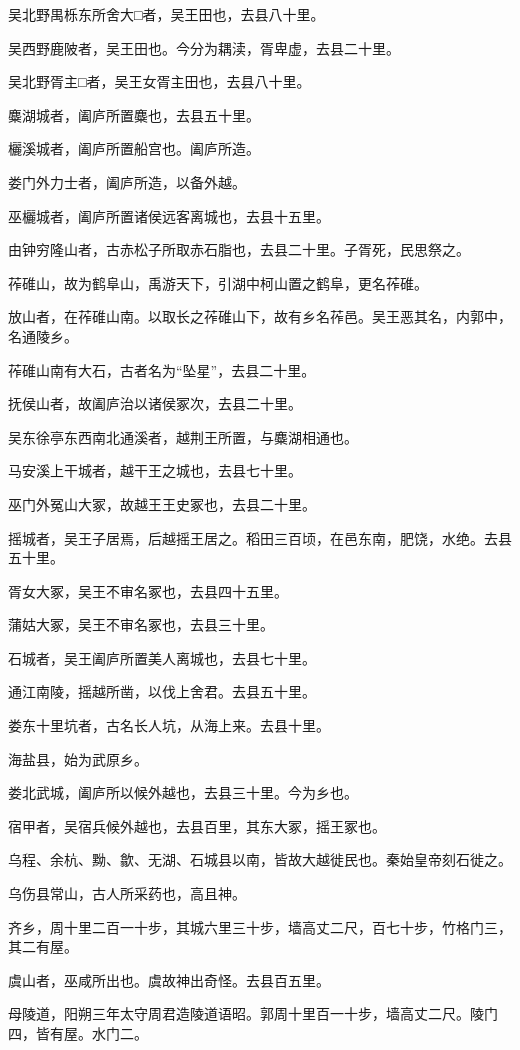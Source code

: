 \documentclass[12pt,UTF8]{ctexbook}
\begin{document}
吴北野禺栎东所舍大□者，吴王田也，去县八十里。

吴西野鹿陂者，吴王田也。今分为耦渎，胥卑虚，去县二十里。

吴北野胥主□者，吴王女胥主田也，去县八十里。

麋湖城者，阖庐所置麋也，去县五十里。

欐溪城者，阖庐所置船宫也。阖庐所造。

娄门外力士者，阖庐所造，以备外越。

巫欐城者，阖庐所置诸侯远客离城也，去县十五里。

由钟穷隆山者，古赤松子所取赤石脂也，去县二十里。子胥死，民思祭之。

莋碓山，故为鹤阜山，禹游天下，引湖中柯山置之鹤阜，更名莋碓。

放山者，在莋碓山南。以取长之莋碓山下，故有乡名莋邑。吴王恶其名，内郭中，名通陵乡。

莋碓山南有大石，古者名为“坠星”，去县二十里。

抚侯山者，故阖庐治以诸侯冢次，去县二十里。

吴东徐亭东西南北通溪者，越荆王所置，与麋湖相通也。

马安溪上干城者，越干王之城也，去县七十里。

巫门外冤山大冢，故越王王史冢也，去县二十里。

摇城者，吴王子居焉，后越摇王居之。稻田三百顷，在邑东南，肥饶，水绝。去县五十里。

胥女大冢，吴王不审名冢也，去县四十五里。

蒲姑大冢，吴王不审名冢也，去县三十里。

石城者，吴王阖庐所置美人离城也，去县七十里。

通江南陵，摇越所凿，以伐上舍君。去县五十里。

娄东十里坑者，古名长人坑，从海上来。去县十里。

海盐县，始为武原乡。

娄北武城，阖庐所以候外越也，去县三十里。今为乡也。

宿甲者，吴宿兵候外越也，去县百里，其东大冢，摇王冢也。

乌程、余杭、黝、歙、无湖、石城县以南，皆故大越徙民也。秦始皇帝刻石徙之。

乌伤县常山，古人所采药也，高且神。

齐乡，周十里二百一十步，其城六里三十步，墙高丈二尺，百七十步，竹格门三，其二有屋。

虞山者，巫咸所出也。虞故神出奇怪。去县百五里。

母陵道，阳朔三年太守周君造陵道语昭。郭周十里百一十步，墙高丈二尺。陵门四，皆有屋。水门二。
\end{document}
